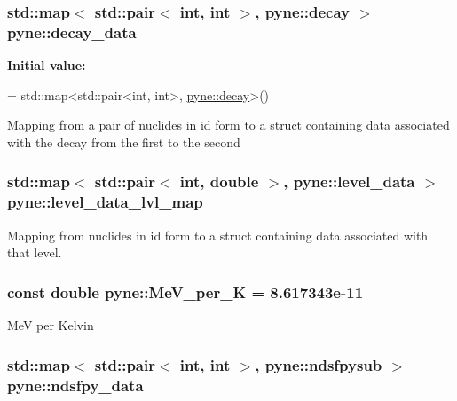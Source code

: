 \hypertarget{namespacepyne_ac880c3701eca3453cb9cdfab30195d65}{
\subsubsection[{decay\-\_\-data}]{\setlength{\rightskip}{0pt plus 5cm}std\-::map$<$ std\-::pair$<$ int, int $>$, {\bf pyne\-::decay} $>$ pyne\-::decay\-\_\-data}}\label{namespacepyne_ac880c3701eca3453cb9cdfab30195d65}
{\bfseries Initial value\-:}
\begin{DoxyCode}
= 
  std::map<std::pair<int, int>, \hyperlink{structpyne_1_1decay}{pyne::decay}>()
\end{DoxyCode}
Mapping from a pair of nuclides in id form to a struct containing data associated with the decay from the first to the second \hypertarget{namespacepyne_aa5b6136e3970959756640b867754bb62}{
\subsubsection[{level\-\_\-data\-\_\-lvl\-\_\-map}]{\setlength{\rightskip}{0pt plus 5cm}std\-::map$<$ std\-::pair$<$ int, double $>$, {\bf pyne\-::level\-\_\-data} $>$ pyne\-::level\-\_\-data\-\_\-lvl\-\_\-map}}\label{namespacepyne_aa5b6136e3970959756640b867754bb62}
Mapping from nuclides in id form to a struct containing data associated with that level. \hypertarget{namespacepyne_af4fb3aac22e7bda0ece3bcf515151611}{
\subsubsection[{Me\-V\-\_\-per\-\_\-\-K}]{\setlength{\rightskip}{0pt plus 5cm}const double pyne\-::\-Me\-V\-\_\-per\-\_\-\-K = 8.\-617343e-\/11}}\label{namespacepyne_af4fb3aac22e7bda0ece3bcf515151611}
Me\-V per Kelvin \hypertarget{namespacepyne_a0526a4bf1637612d760c106836475c6d}{
\subsubsection[{ndsfpy\-\_\-data}]{\setlength{\rightskip}{0pt plus 5cm}std\-::map$<$ std\-::pair$<$ int, int $>$, {\bf pyne\-::ndsfpysub} $>$ pyne\-::ndsfpy\-\_\-data}}\label{namespacepyne_a0526a4bf1637612d760c106836475c6d}
